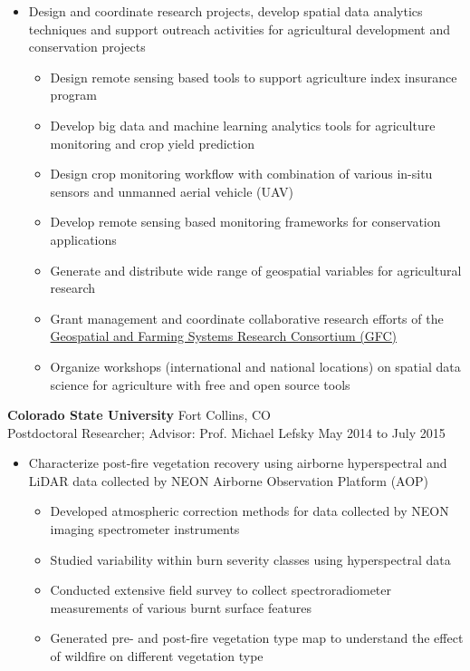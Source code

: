 \documentclass[11pt]{article}
\newenvironment{outerlist}[1][\enskip\textbullet]%
        {\begin{itemize}[#1,leftmargin=*]}{\end{itemize}%
         \vspace{-.6\baselineskip}}
\newenvironment{innerlist}[1][\enskip\textbullet]%
        {\begin{itemize}[#1,leftmargin=*,parsep=0pt,itemsep=0pt,topsep=0pt,partopsep=0pt]}
        {\end{itemize}}
\begin{document}
\begin{outerlist}
\item[] Design and coordinate research projects, develop spatial data analytics techniques and support outreach activities for agricultural development and conservation projects
    \begin{innerlist}
        \item Design remote sensing based tools to support agriculture index insurance program
        \item Develop big data and machine learning analytics tools for agriculture monitoring and crop yield prediction
        \item Design crop monitoring workflow with combination of various in-situ sensors and unmanned aerial vehicle (UAV)
        \item Develop remote sensing based monitoring frameworks for conservation applications
        \item Generate and distribute wide range of geospatial variables for agricultural research
        \item Grant management and coordinate collaborative research efforts of the \href{gfc.ucdavis.edu}{Geospatial and Farming Systems Research Consortium (GFC)}
        \item Organize workshops (international and national locations) on spatial data science for agriculture with free and open source tools
    \end{innerlist}
\end{outerlist}
\vspace{.12in}

\textbf{Colorado State University} \hfill {Fort Collins, CO}\\
Postdoctoral Researcher; Advisor: Prof. Michael Lefsky \hfill {May 2014 to July 2015}

\begin{outerlist}
\item[]Characterize post-fire vegetation recovery using airborne hyperspectral and LiDAR data collected by NEON Airborne Observation Platform (AOP)
    \begin{innerlist}
        \item Developed atmospheric correction methods for data collected by NEON imaging spectrometer instruments 
        \item Studied variability within burn severity classes using hyperspectral data 
        \item Conducted extensive field survey to collect spectroradiometer measurements of various burnt surface features
        \item Generated pre- and post-fire vegetation type map to understand the effect of wildfire on different vegetation type
    \end{innerlist}
\end{outerlist}
\vspace{.12in}
\end{document}
